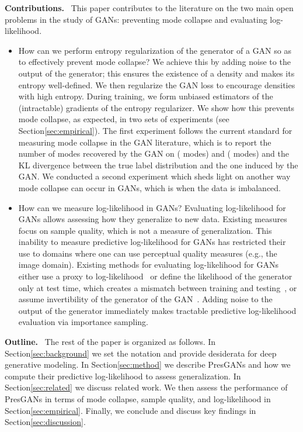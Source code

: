 \documentclass[11pt]{article}
\DeclareRobustCommand{\parhead}[1]{\textbf{#1}~}
\begin{document}
\parhead{Contributions.} This paper contributes to the literature on the two main open problems in the study of \glspl{GAN}: preventing mode collapse and evaluating log-likelihood.
\begin{itemize}[leftmargin=*]
	\item How can we perform entropy regularization of the generator of a \gls{GAN} so as to effectively prevent mode collapse? We achieve this by adding noise to the output of the generator; this ensures the existence of a density  and makes its entropy well-defined. We then regularize the \gls{GAN} loss to encourage densities  with high entropy. During training, we form unbiased estimators of the (intractable) gradients of the entropy regularizer. We show how this prevents mode collapse, as expected, in two sets of experiments (see Section\nobreakspace \ref {sec:empirical}). The first experiment follows the current standard for measuring mode collapse in the \gls{GAN} literature, which is to report the number of modes recovered by the \gls{GAN} on  ( modes) and  ( modes) and the \gls{KL} divergence between the true label distribution and the one induced by the \gls{GAN}. We conducted a second experiment which sheds light on another way mode collapse can occur in \glspl{GAN}, which is when the data is imbalanced.
	\item How can we measure log-likelihood in \glspl{GAN}? Evaluating log-likelihood for \glspl{GAN} allows assessing how they generalize to new data. Existing measures focus on sample quality, which is not a measure of generalization. This inability to measure predictive log-likelihood for \glspl{GAN} has restricted their use to domains where one can use perceptual quality measures (e.g., the image domain). 
	Existing methods for evaluating log-likelihood for \glspl{GAN} either use a proxy to log-likelihood~\citep{sanchez2019out} or define the likelihood of the generator only at test time, which creates a mismatch between training and testing~\citep{wu2016quantitative}, or assume invertibility of the generator of the \gls{GAN}~\citep{grover2018flow}. Adding noise to the output of the generator immediately makes tractable predictive log-likelihood evaluation via importance sampling. 
\end{itemize} 

\parhead{Outline.} The rest of the paper is organized as follows. In Section\nobreakspace \ref {sec:background} we set the notation and provide desiderata for deep generative modeling. In Section\nobreakspace \ref {sec:method} we describe Pres\glspl{GAN} and how we compute their predictive log-likelihood to assess generalization. In Section\nobreakspace \ref {sec:related} we discuss related work. We then assess the performance of Pres\glspl{GAN} in terms of mode collapse, sample quality, and log-likelihood in Section\nobreakspace \ref {sec:empirical}. Finally, we conclude and discuss key findings in Section\nobreakspace \ref {sec:discussion}.
 
\end{document}
